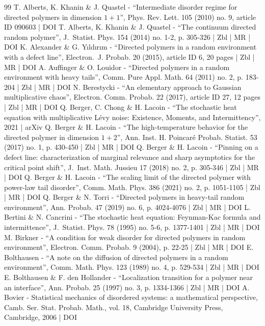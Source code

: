\begin{thebibliography}{99}
T. Alberts, K. Khanin \& J. Quastel - “Intermediate disorder regime for directed polymers in dimension $1+1$”, Phys. Rev. Lett. 105 (2010) no. 9, article ID 090603 | DOI
T. Alberts, K. Khanin \& J. Quastel - “The continuum directed random polymer”, J. Statist. Phys. 154 (2014) no. 1-2, p. 305-326 | Zbl | MR | DOI
K. Alexander \& G. Yıldırım - “Directed polymers in a random environment with a defect line”, Electron. J. Probab. 20 (2015), article ID 6, 20 pages | Zbl | MR | DOI
A. Auffinger \& O. Louidor - “Directed polymers in a random environment with heavy tails”, Comm. Pure Appl. Math. 64 (2011) no. 2, p. 183-204 | Zbl | MR | DOI
N. Berestycki - “An elementary approach to Gaussian multiplicative chaos”, Electron. Comm. Probab. 22 (2017), article ID 27, 12 pages | Zbl | MR | DOI
Q. Berger, C. Chong \& H. Lacoin - “The stochastic heat equation with multiplicative Lévy noise: Existence, Moments, and Intermittency”, 2021 | arXiv
Q. Berger \& H. Lacoin - “The high-temperature behavior for the directed polymer in dimension $1+2$”, Ann. Inst. H. Poincaré Probab. Statist. 53 (2017) no. 1, p. 430-450 | Zbl | MR | DOI
Q. Berger \& H. Lacoin - “Pinning on a defect line: characterization of marginal relevance and sharp asymptotics for the critical point shift”, J. Inst. Math. Jussieu 17 (2018) no. 2, p. 305-346 | Zbl | MR | DOI
Q. Berger \& H. Lacoin - “The scaling limit of the directed polymer with power-law tail disorder”, Comm. Math. Phys. 386 (2021) no. 2, p. 1051-1105 | Zbl | MR | DOI
Q. Berger \& N. Torri - “Directed polymers in heavy-tail random environment”, Ann. Probab. 47 (2019) no. 6, p. 4024-4076 | Zbl | MR | DOI
L. Bertini \& N. Cancrini - “The stochastic heat equation: Feynman-Kac formula and intermittence”, J. Statist. Phys. 78 (1995) no. 5-6, p. 1377-1401 | Zbl | MR | DOI
M. Birkner - “A condition for weak disorder for directed polymers in random environment”, Electron. Comm. Probab. 9 (2004), p. 22-25 | Zbl | MR | DOI
E. Bolthausen - “A note on the diffusion of directed polymers in a random environment”, Comm. Math. Phys. 123 (1989) no. 4, p. 529-534 | Zbl | MR | DOI
E. Bolthausen \& F. den Hollander - “Localization transition for a polymer near an interface”, Ann. Probab. 25 (1997) no. 3, p. 1334-1366 | Zbl | MR | DOI
A. Bovier - Statistical mechanics of disordered systems: a mathematical perspective, Camb. Ser. Stat. Probab. Math., vol. 18, Cambridge University Press, Cambridge, 2006 | DOI

\end{thebibliography}

